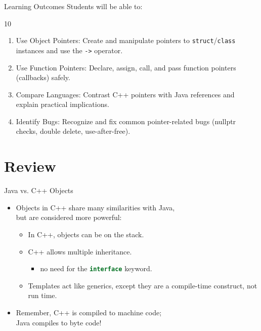 \documentclass[14pt,aspectratio=1610]{beamer}
\begin{document}
\begin{frame}{Learning Outcomes}
Students will be able to:

\begin{overlayarea}{\linewidth}{10\baselineskip}
\begin{enumerate}\addtocounter{enumi}{6}
  \item {Use Object Pointers}: Create and manipulate pointers to \lstinline{struct}/\lstinline{class} instances and use the \lstinline{->} operator.
  \item {Use Function Pointers}: Declare, assign, call, and pass function pointers (callbacks) safely.
  \item {Compare Languages}: Contrast C++ pointers with Java references and explain practical implications.
  \item {Identify Bugs}: Recognize and fix common pointer-related bugs (nullptr checks, double delete, use-after-free).
\end{enumerate}
\end{overlayarea}
\end{frame}

\section{Review}

\begin{frame}{Java vs. C++ Objects}
\begin{itemize}[<+->]
\item Objects in C++ share many similarities with Java, \\
  but are considered more powerful:
\begin{itemize}
\item In C++, objects can be on the stack.
\item C++ allows multiple inheritance.
\begin{itemize}
\item no need for the \lstinline[language=Java]{interface} keyword.
\end{itemize}
\item Templates act like generics, except they are a compile-time construct, not run time.
\end{itemize}
\item Remember, C++ is compiled to machine code; \\Java compiles to byte code!
\end{itemize}
\end{frame}
\end{document}
